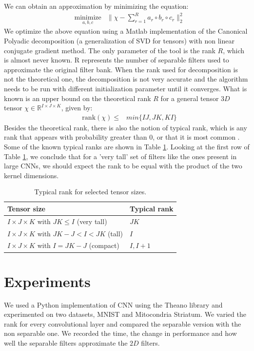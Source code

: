 \documentclass{article} %
\begin{document}
We can obtain an approximation by minimizing the equation:
\begin{equation*}
\begin{aligned}
& \underset{a,b,c}{\text{minimize}}
& \| \chi - \sum_{r=1}^{R}{a_{r}\circ b_{r}\circ c_{r}} \|_{2}^{2} 
\end{aligned}
\end{equation*}
We optimize the above equation using a Matlab implementation of the Canonical Polyadic decomposition (a generalization of  SVD for tensors) with  non linear conjugate gradient method. The only parameter of the tool is the rank $R$, which is almost never known.
R represents the number of separable filters used to approximate the original filter bank. When the rank used for decomposition is not the theoretical one, the decomposition is not very accurate and the algorithm needs to be run with different initialization parameter until it converges.
What is known is an upper bound on the theoretical rank $R$ for a  general tensor $3D$ tensor $\chi \in \mathbb{R}^{I\times J\times K}$, given by:
 \begin{equation*}
\begin{aligned}
& \text{rank}(\chi) \leq 
& min{\{IJ, JK, KI\}}
\end{aligned}
\end{equation*} 
Besides the theoretical rank, there is also the notion of typical rank, which is any rank
that appears with probability greater than 0, or that it is most common \cite{KoBa09}.
Some of the known typical ranks are shown in Table \ref{table:rank}.
Looking at the first row of Table \ref{table:rank}, we conclude that for a 'very tall' set of filters like the ones present in large CNNs, 
we should expect the rank to be equal with the product of the two kernel dimensions.
 \begin{table}
\centering
\begin{tabular}{@{}ll@{}}\toprule
Tensor size & Typical rank \\ \midrule
$I \times J \times K$ with $JK \leq I$ (very tall) & $JK$\\
$I \times J \times K$ with $JK - J < I < JK$ (tall) & $I$ \\
$I \times J \times K$ with $I = JK - J$ (compact) & $I, I+1$  \\ \bottomrule
\end{tabular}
\caption{Typical rank for selected tensor sizes.}
\label{table:rank}
\end{table}

\section{Experiments}
We used a Python implementation of CNN using the Theano library and experimented on two datasets, MNIST and Mitocondria Striatum. 
We varied the rank for every convolutional layer and compared the separable version with the non separable one. We recorded the time, the change in performance and how well the separable filters approximate the $2D$ filters. 



\end{document}
